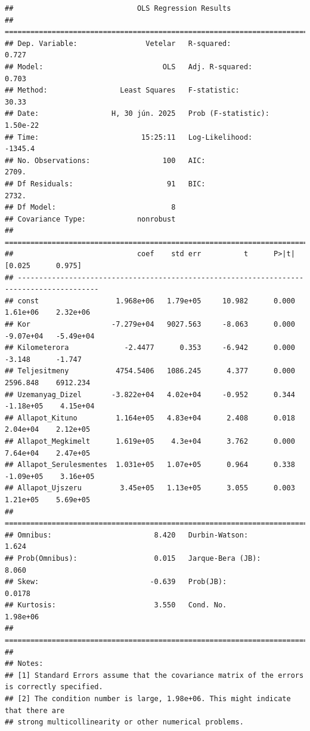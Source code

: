 \documentclass[
]{book}
\begin{document}
\begin{verbatim}
##                             OLS Regression Results                            
## ==============================================================================
## Dep. Variable:                Vetelar   R-squared:                       0.727
## Model:                            OLS   Adj. R-squared:                  0.703
## Method:                 Least Squares   F-statistic:                     30.33
## Date:                 H, 30 jún. 2025   Prob (F-statistic):           1.50e-22
## Time:                        15:25:11   Log-Likelihood:                -1345.4
## No. Observations:                 100   AIC:                             2709.
## Df Residuals:                      91   BIC:                             2732.
## Df Model:                           8                                         
## Covariance Type:            nonrobust                                         
## =========================================================================================
##                             coef    std err          t      P>|t|      [0.025      0.975]
## -----------------------------------------------------------------------------------------
## const                  1.968e+06   1.79e+05     10.982      0.000    1.61e+06    2.32e+06
## Kor                   -7.279e+04   9027.563     -8.063      0.000   -9.07e+04   -5.49e+04
## Kilometerora             -2.4477      0.353     -6.942      0.000      -3.148      -1.747
## Teljesitmeny           4754.5406   1086.245      4.377      0.000    2596.848    6912.234
## Uzemanyag_Dizel       -3.822e+04   4.02e+04     -0.952      0.344   -1.18e+05    4.15e+04
## Allapot_Kituno         1.164e+05   4.83e+04      2.408      0.018    2.04e+04    2.12e+05
## Allapot_Megkimelt      1.619e+05    4.3e+04      3.762      0.000    7.64e+04    2.47e+05
## Allapot_Serulesmentes  1.031e+05   1.07e+05      0.964      0.338   -1.09e+05    3.16e+05
## Allapot_Ujszeru         3.45e+05   1.13e+05      3.055      0.003    1.21e+05    5.69e+05
## ==============================================================================
## Omnibus:                        8.420   Durbin-Watson:                   1.624
## Prob(Omnibus):                  0.015   Jarque-Bera (JB):                8.060
## Skew:                          -0.639   Prob(JB):                       0.0178
## Kurtosis:                       3.550   Cond. No.                     1.98e+06
## ==============================================================================
## 
## Notes:
## [1] Standard Errors assume that the covariance matrix of the errors is correctly specified.
## [2] The condition number is large, 1.98e+06. This might indicate that there are
## strong multicollinearity or other numerical problems.
\end{verbatim}
\end{document}
